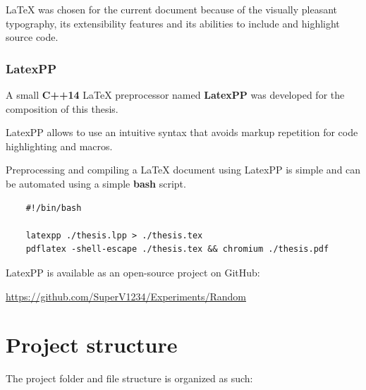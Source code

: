 \documentclass[12pt]{report}
\newcommand{\+}{\discretionary{\mbox{\scriptsize$\hookleftarrow$}}{}{}}
\renewcommand\emph{\textbf}
\begin{document}
                \LaTeX{} was chosen for the current document because of the visually pleasant typography, its extensibility features and its abilities to include and highlight source code.

                \subsection{LatexPP}
                    A small \emph{C++14} \LaTeX{} preprocessor named \emph{LatexPP} was developed for the composition of this thesis.

                    LatexPP allows to use an intuitive syntax that avoids markup repetition for code highlighting and macros.

                    Preprocessing and compiling a \LaTeX{} document using LatexPP is simple and can be automated using a simple \emph{bash} script.

\begin{verbatim}
    #!/bin/bash

    latexpp ./thesis.lpp > ./thesis.tex
    pdflatex -shell-escape ./thesis.tex && chromium ./thesis.pdf
\end{verbatim}

                    LatexPP is available as an open-source project on GitHub:

                    \url{https://github.com/SuperV1234/Experiments/Random}


        \chapter{Project structure}
            The project folder and file structure is organized as such:
\end{document}
